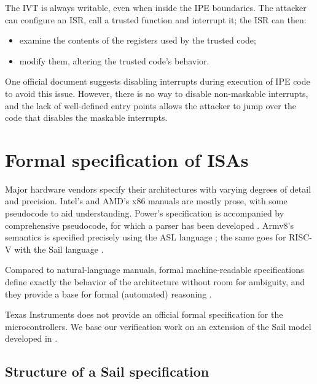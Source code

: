 The IVT is always writable, even when inside the IPE boundaries. The attacker can configure an ISR, call a trusted function and interrupt it; the ISR can then:
\begin{itemize}
\item examine the contents of the registers used by the trusted code;
\item modify them, altering the trusted code's behavior.
\end{itemize}

One official document \cite{slaa685} suggests disabling interrupts during execution of IPE code to avoid this issue. However, there is no way to disable non-maskable interrupts, and the lack of well-defined entry points allows the attacker to jump over the code that disables the maskable interrupts.



\section{Formal specification of ISAs}

Major hardware vendors specify their architectures with varying degrees of detail and precision. Intel's \cite{Intel2025} and AMD's \cite{AMD2024} x86 manuals are mostly prose, with some pseudocode to aid understanding. Power's specification \cite{OPF2024} is accompanied by comprehensive pseudocode, for which a parser has been developed \cite{libreSOC}. Armv8's semantics is specified precisely using the ASL language \cite{Arm2020}\cite{Reid2016}; the same goes for RISC-V with the Sail language \cite{RVSail}.

Compared to natural-language manuals, formal machine-readable specifications define exactly the behavior of the architecture without room for ambiguity, and they provide a base for formal (automated) reasoning \cite{Armstrong2018}.

Texas Instruments does not provide an official formal specification for the \msp microcontrollers. We base our verification work on an extension of the \msp Sail model developed in \cite{mspthesis}.

\subsection{Structure of a Sail specification}
\label{sec:sail-structure}

